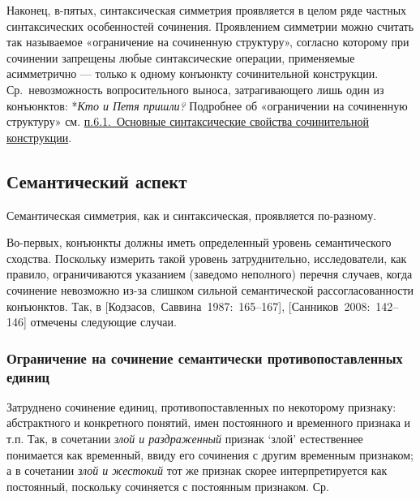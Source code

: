 Наконец, в-пятых, синтаксическая симметрия проявляется в целом ряде
частных синтаксических особенностей сочинения. Проявлением симметрии
можно считать так называемое «ограничение на сочиненную структуру»,
согласно которому при сочинении запрещены любые синтаксические операции,
применяемые асимметрично --- только к одному конъюнкту сочинительной
конструкции. Ср.~невозможность вопросительного выноса, затрагивающего
лишь один из конъюнктов: *\textit{Кто и Петя пришли?} Подробнее об
«ограничении на сочиненную структуру» см. \underline{п.6.1.~Основные
  синтаксические свойства сочинительной конструкции}.

\subsection{Семантический
  аспект}\label{ux441ux435ux43cux430ux43dux442ux438ux447ux435ux441ux43aux438ux439-ux430ux441ux43fux435ux43aux442}

Семантическая симметрия, как и синтаксическая, проявляется по-разному.

Во-первых, конъюнкты должны иметь определенный уровень семантического
сходства. Поскольку измерить такой уровень затруднительно,
исследователи, как правило, ограничиваются указанием (заведомо
неполного) перечня случаев, когда сочинение невозможно из-за слишком
сильной семантической рассогласованности конъюнктов. Так, в
{[}Кодзасов,~Саввина~1987:~165--167{]}, {[}Санников~2008:~142--146{]}
отмечены следующие случаи.

\subsubsection{Ограничение на сочинение семантически противопоставленных
  единиц}\label{ux43eux433ux440ux430ux43dux438ux447ux435ux43dux438ux435-ux43dux430-ux441ux43eux447ux438ux43dux435ux43dux438ux435-ux441ux435ux43cux430ux43dux442ux438ux447ux435ux441ux43aux438-ux43fux440ux43eux442ux438ux432ux43eux43fux43eux441ux442ux430ux432ux43bux435ux43dux43dux44bux445-ux435ux434ux438ux43dux438ux446}

Затруднено сочинение единиц, противопоставленных по некоторому признаку:
абстрактного и конкретного понятий, имен постоянного и временного
признака и т.п. Так, в сочетании \textit{злой и раздраженный} признак
`злой' естественнее понимается как временный, ввиду его сочинения с
другим временным признаком; а в сочетании \textit{злой и жестокий} тот же
признак скорее интерпретируется как постоянный, поскольку сочиняется с
постоянным признаком. Ср.


